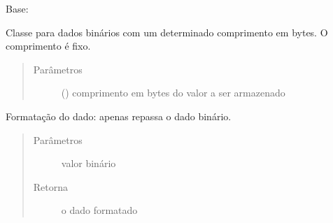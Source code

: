 \documentclass[letterpaper,10pt,brazil]{sphinxmanual}
\begin{document}
\begin{fulllineitems}
\label{\detokenize{estrutarq.dado:estrutarq.dado.DadoBinario}}
\pysigstartsignatures
{}
\pysigstopsignatures
\sphinxAtStartPar
Base: {\hyperref[\detokenize{estrutarq.dado:estrutarq.dado.DadoBasico}]{}}

\sphinxAtStartPar
Classe para dados binários com um determinado comprimento em bytes.
O comprimento é fixo.
\begin{quote}\begin{description}
\item[{Parâmetros}] \leavevmode
\sphinxAtStartPar
{} () \textendash{} comprimento em bytes do valor a ser armazenado

\end{description}\end{quote}

\begin{fulllineitems}
\label{\detokenize{estrutarq.dado:estrutarq.dado.DadoBinario.adicione_formatacao}}
\pysigstartsignatures
{}
\pysigstopsignatures
\sphinxAtStartPar
Formatação do dado: apenas repassa o dado binário.
\begin{quote}\begin{description}
\item[{Parâmetros}] \leavevmode
\sphinxAtStartPar
{} \textendash{} valor binário

\item[{Retorna}] \leavevmode
\sphinxAtStartPar
o dado formatado


\end{description}
\end{quote}
\end{fulllineitems}
\end{fulllineitems}
\end{document}

